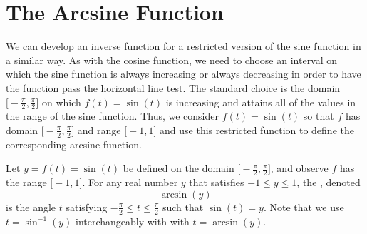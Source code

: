 \documentclass{ximera}
\begin{document}
\section{The Arcsine Function}

We can develop an inverse function for a restricted version of the sine function in a similar way.  As with the cosine function, we need to choose an interval on which the sine function is always increasing or always decreasing in order to have the function pass the horizontal line test.  The standard choice is the domain $\Big[\!\!-\!\frac{\pi}{2}, \frac{\pi}{2}\Big]$ on which $f(t) = \sin(t)$ is increasing and attains all of the values in the range of the sine function.  Thus, we consider $f(t) = \sin(t)$ so that $f$ has domain $\Big[\!-\frac{\pi}{2}, \frac{\pi}{2}\Big]$ and range $\big[\!-1,1\big]$ and use this restricted function to define the corresponding arcsine function.%
\begin{definition}
Let $y = f(t) = \sin(t)$ be defined on the domain $\Big[\!\!-\!\frac{\pi}{2}, \frac{\pi}{2}\Big]$, and observe $f$ has the range $\big[\!-1,1\big]$.  For any real number $y$ that satisfies $-1 \leq y \leq 1$, the , denoted%
\begin{equation*}
\arcsin(y)
\end{equation*}
is the angle $t$ satisfying $-\frac{\pi}{2} \leq t \leq \frac{\pi}{2}$ such that $\sin(t) = y$.
%
Note that we use $t=\sin^{-1}(y)$ interchangeably with with $t = \arcsin(y)$. 
\end{definition}
\end{document}
